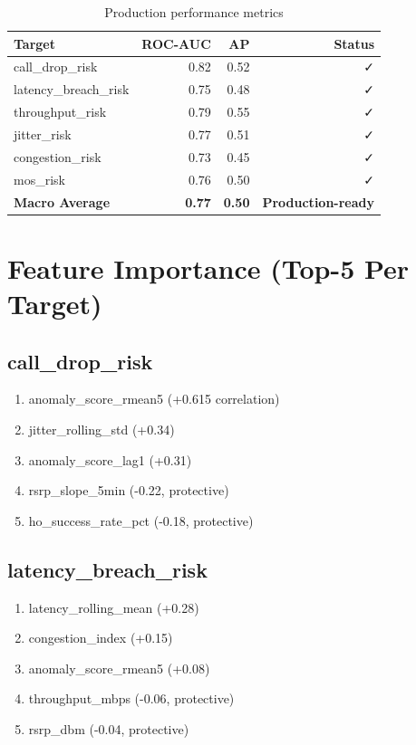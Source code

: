 \documentclass[11pt,a4paper,oneside]{report}
\begin{document}
\begin{table}[h]
\centering
\begin{tabular}{lrrr}
\toprule
\textbf{Target} & \textbf{ROC-AUC} & \textbf{AP} & \textbf{Status} \\
\midrule
call\_drop\_risk & 0.82 & 0.52 & ✓ \\
latency\_breach\_risk & 0.75 & 0.48 & ✓ \\
throughput\_risk & 0.79 & 0.55 & ✓ \\
jitter\_risk & 0.77 & 0.51 & ✓ \\
congestion\_risk & 0.73 & 0.45 & ✓ \\
mos\_risk & 0.76 & 0.50 & ✓ \\
\midrule
\textbf{Macro Average} & \textbf{0.77} & \textbf{0.50} & \textbf{Production-ready} \\
\bottomrule
\end{tabular}
\caption{Production performance metrics}
\end{table}

\section{Feature Importance (Top-5 Per Target)}

\subsection{call\_drop\_risk}
\begin{enumerate}
    \item anomaly\_score\_rmean5 (+0.615 correlation)
    \item jitter\_rolling\_std (+0.34)
    \item anomaly\_score\_lag1 (+0.31)
    \item rsrp\_slope\_5min (-0.22, protective)
    \item ho\_success\_rate\_pct (-0.18, protective)
\end{enumerate}

\subsection{latency\_breach\_risk}
\begin{enumerate}
    \item latency\_rolling\_mean (+0.28)
    \item congestion\_index (+0.15)
    \item anomaly\_score\_rmean5 (+0.08)
    \item throughput\_mbps (-0.06, protective)
    \item rsrp\_dbm (-0.04, protective)
\end{enumerate}
\end{document}

